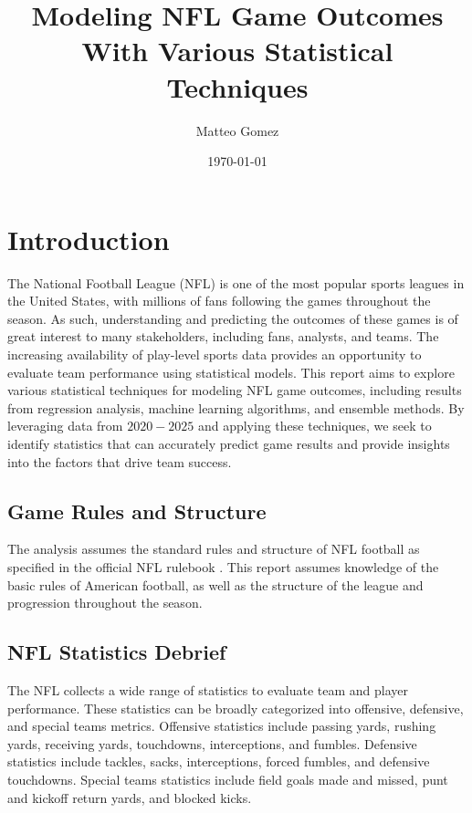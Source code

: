 \documentclass[11pt]{article}
\begin{document}
\title{Modeling NFL Game Outcomes With Various Statistical Techniques}
\author{Matteo Gomez}
\date{\today}
\maketitle

\section*{Introduction}
The National Football League (NFL) is one of the most popular sports leagues in the United States, with millions of fans following the games throughout the season. As such, understanding and predicting the outcomes of these games is of great interest to many stakeholders, including fans, analysts, and teams. The increasing availability of play-level sports data provides an opportunity to evaluate team performance using statistical models. This report aims to explore various statistical techniques for modeling NFL game outcomes, including results from regression analysis, machine learning algorithms, and ensemble methods. By leveraging data from $2020-2025$ and applying these techniques, we seek to identify statistics that can accurately predict game results and provide insights into the factors that drive team success.

\subsection*{Game Rules and Structure}
The analysis assumes the standard rules and structure of NFL football as specified in the official NFL rulebook \cite{nfl_rules}. This report assumes knowledge of the basic rules of American football, as well as the structure of the league and progression throughout the season.

\subsection*{NFL Statistics Debrief}
The NFL collects a wide range of statistics to evaluate team and player performance. These statistics can be broadly categorized into offensive, defensive, and special teams metrics. Offensive statistics include passing yards, rushing yards, receiving yards, touchdowns, interceptions, and fumbles. Defensive statistics include tackles, sacks, interceptions, forced fumbles, and defensive touchdowns. Special teams statistics include field goals made and missed, punt and kickoff return yards, and blocked kicks.
\end{document}
